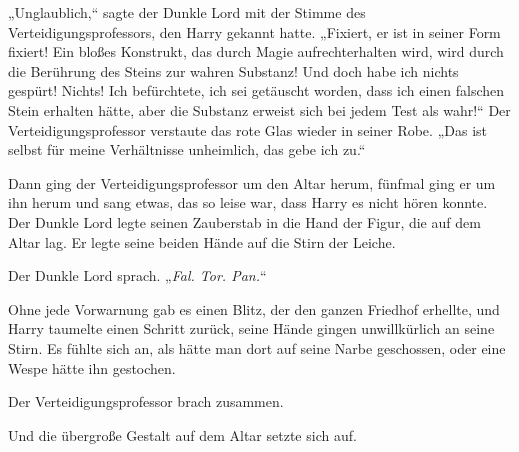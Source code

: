 „Unglaublich,“ sagte der Dunkle Lord mit der Stimme des Verteidigungsprofessors, den Harry gekannt hatte. „Fixiert, er ist in seiner Form fixiert! Ein bloßes Konstrukt, das durch Magie aufrechterhalten wird, wird durch die Berührung des Steins zur wahren Substanz! Und doch habe ich nichts gespürt! Nichts! Ich befürchtete, ich sei getäuscht worden, dass ich einen falschen Stein erhalten hätte, aber die Substanz erweist sich bei jedem Test als wahr!“
Der Verteidigungsprofessor verstaute das rote Glas wieder in seiner Robe.
„Das ist selbst für meine Verhältnisse unheimlich, das gebe ich zu.“

Dann ging der Verteidigungsprofessor um den Altar herum, fünfmal ging er um ihn herum und sang etwas, das so leise war, dass Harry es nicht hören konnte.
Der Dunkle Lord legte seinen Zauberstab in die Hand der Figur, die auf dem Altar lag.
Er legte seine beiden Hände auf die Stirn der Leiche.

Der Dunkle Lord sprach. „\emph{Fal. Tor. Pan.}“

Ohne jede Vorwarnung gab es einen Blitz, der den ganzen Friedhof erhellte, und Harry taumelte einen Schritt zurück, seine Hände gingen unwillkürlich an seine Stirn.
Es fühlte sich an, als hätte man dort auf seine Narbe geschossen, oder eine Wespe hätte ihn gestochen.

Der Verteidigungsprofessor brach zusammen.

Und die übergroße Gestalt auf dem Altar setzte sich auf.

